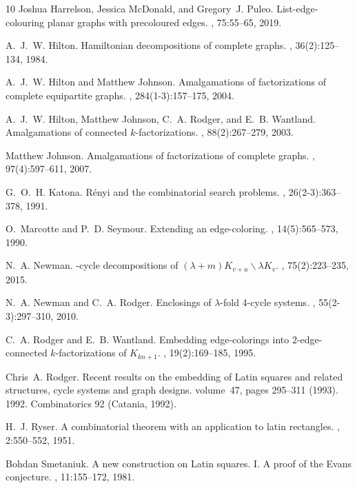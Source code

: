 \documentclass[12pt,oneside]{amsart}
\begin{document}
\begin{thebibliography}{10}
Joshua Harrelson, Jessica McDonald, and Gregory~J. Puleo.
\newblock List-edge-colouring planar graphs with precoloured edges.
, 75:55--65, 2019.

A.~J.~W. Hilton.
\newblock Hamiltonian decompositions of complete graphs.
, 36(2):125--134, 1984.

A.~J.~W. Hilton and Matthew Johnson.
\newblock Amalgamations of factorizations of complete equipartite graphs.
, 284(1-3):157--175, 2004.

A.~J.~W. Hilton, Matthew Johnson, C.~A. Rodger, and E.~B. Wantland.
\newblock Amalgamations of connected {$k$}-factorizations.
, 88(2):267--279, 2003.

Matthew Johnson.
\newblock Amalgamations of factorizations of complete graphs.
, 97(4):597--611, 2007.

G.~O.~H. Katona.
\newblock R\'{e}nyi and the combinatorial search problems.
, 26(2-3):363--378, 1991.

O.~Marcotte and P.~D. Seymour.
\newblock Extending an edge-coloring.
, 14(5):565--573, 1990.

N.~A. Newman.
-cycle decompositions of {$(\lambda+m)K_{v+u}\backslash\lambda
  K_v$}.
, 75(2):223--235, 2015.

N.~A. Newman and C.~A. Rodger.
\newblock Enclosings of {$\lambda$}-fold 4-cycle systems.
, 55(2-3):297--310, 2010.

C.~A. Rodger and E.~B. Wantland.
\newblock Embedding edge-colorings into {$2$}-edge-connected
  {$k$}-factorizations of {$K_{kn+1}$}.
, 19(2):169--185, 1995.

Chris~A. Rodger.
\newblock Recent results on the embedding of {L}atin squares and related
  structures, cycle systems and graph designs.
\newblock volume~47, pages 295--311 (1993). 1992.
\newblock Combinatorics 92 (Catania, 1992).

H.~J. Ryser.
\newblock A combinatorial theorem with an application to latin rectangles.
, 2:550--552, 1951.

Bohdan Smetaniuk.
\newblock A new construction on {L}atin squares. {I}. {A} proof of the {E}vans
  conjecture.
, 11:155--172, 1981.

\end{thebibliography}
\end{document}

